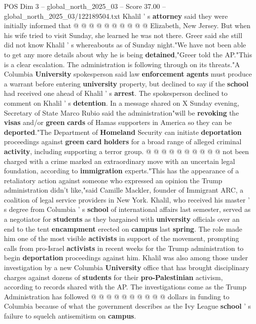\begin{textsample}{POS Dim 3 – global\_north\_2025\_03 – Score 37.00 – global\_north\_2025\_03/122189504.txt}
Khalil ' s \textbf{attorney} said they were initially informed that @ @ @ @ @ @ @ @ @ @ Elizabeth, New Jersey.
But when his wife tried to visit Sunday, she learned he was not there.
Greer said she still did not know Khalil ' s whereabouts as of Sunday night."We have not been able to get any more details about why he is being \textbf{detained},"Greer told the AP."This is a clear escalation.
The administration is following through on its threats."A Columbia \textbf{University} spokesperson said law \textbf{enforcement} \textbf{agents} must produce a warrant before entering \textbf{university} property, but declined to say if the \textbf{school} had received one ahead of Khalil ' s \textbf{arrest}.
The spokesperson declined to comment on Khalil ' s \textbf{detention}.
In a message shared on X Sunday evening, Secretary of State Marco Rubio said the administration"will be \textbf{revoking} the \textbf{visas} and/or \textbf{green} \textbf{cards} of Hamas supporters in America so they can be \textbf{deported}."The Department of \textbf{Homeland} Security can initiate \textbf{deportation} proceedings against \textbf{green} \textbf{card} \textbf{holders} for a broad range of alleged criminal \textbf{activity}, including supporting a terror group. @ @ @ @ @ @ @ @ @ @ not been charged with a crime marked an extraordinary move with an uncertain legal foundation, according to \textbf{immigration} experts."This has the appearance of a retaliatory action against someone who expressed an opinion the Trump administration didn't like,"said Camille Mackler, founder of Immigrant ARC, a coalition of legal service providers in New York.
Khalil, who received his master ' s degree from Columbia ' s \textbf{school} of international affairs last semester, served as a negotiator for \textbf{students} as they bargained with \textbf{university} officials over an end to the tent \textbf{encampment} erected on \textbf{campus} last \textbf{spring}.
The role made him one of the most visible \textbf{activists} in support of the movement, prompting calls from pro-Israel \textbf{activists} in recent weeks for the Trump administration to begin \textbf{deportation} proceedings against him.
Khalil was also among those under investigation by a new Columbia \textbf{University} office that has brought disciplinary charges against dozens of \textbf{students} for their \textbf{pro-Palestinian} activism, according to records shared with the AP.
The investigations come as the Trump Administration has followed @ @ @ @ @ @ @ @ @ @ dollars in funding to Columbia because of what the government describes as the Ivy League \textbf{school} ' s failure to squelch antisemitism on \textbf{campus}.

\end{textsample}
